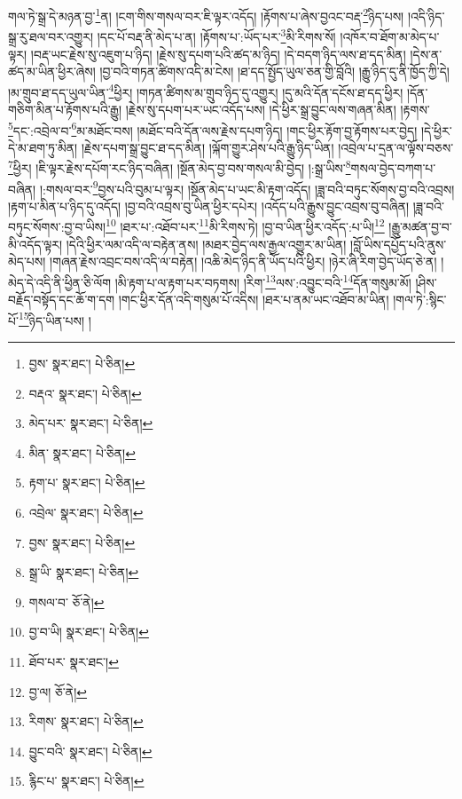གལ་ཏེ་སྒྲ་དེ་མཉན་བྱ་\footnote{བྱས་  སྣར་ཐང་།  པེ་ཅིན། }ན། །ངག་གིས་གསལ་བར་ཇི་ལྟར་འདོད། །རྟོགས་པ་ཞེས་བྱའང་བརྡ་\footnote{བརྡའ་  སྣར་ཐང་།  པེ་ཅིན། }ཉིད་པས། །འདི་ཉིད་སྒྲ་རུ་ཐལ་བར་འགྱུར། །དང་པོ་བརྡ་ནི་མེད་པ་ན། །རྟོགས་པ་:ཡོད་པར་\footnote{མེད་པར་  སྣར་ཐང་།  པེ་ཅིན། }མི་རིགས་སོ། །འཁོར་བ་ཐོག་མ་མེད་པ་ལྟར། །བརྡ་ཡང་རྗེས་སུ་འཇུག་པ་ཉིད། །རྗེས་སུ་དཔག་པའི་ཚད་མ་ཉིད། །དེ་བདག་ཉིད་ལས་ཐ་དད་མིན། །དེས་ན་ཚད་མ་ཡིན་ཕྱིར་ཞེས། །བྱ་བའི་གཏན་ཚིགས་འདི་མ་ངེས། །ཐ་དད་སྤྱོད་ཡུལ་ཅན་གྱི་བློའི། །རྒྱུ་ཉིད་དུ་ནི་ཁྱོད་ཀྱི་དེ། །མ་གྲུབ་ཐ་དད་ཡུལ་ཡིན་\footnote{མིན་  སྣར་ཐང་།  པེ་ཅིན། }ཕྱིར། །གཏན་ཚིགས་མ་གྲུབ་ཉིད་དུ་འགྱུར། །དུ་མའི་དོན་དངོས་ཐ་དད་ཕྱིར། །དོན་གཅིག་མིན་པ་རྟོགས་པའི་རྒྱུ། །རྗེས་སུ་དཔག་པར་ཡང་འདོད་པས། །དེ་ཕྱིར་སྒྲ་བྱུང་ལས་གཞན་མིན། །རྟགས་\footnote{རྟག་པ་  སྣར་ཐང་།  པེ་ཅིན། }དང་:འབྲེལ་བ་\footnote{འབྲེལ་  སྣར་ཐང་།  པེ་ཅིན། }མ་མཐོང་བས། །མཐོང་བའི་དོན་ལས་རྗེས་དཔག་ཉིད། །གང་ཕྱིར་རྟོག་བྱ་རྟོགས་པར་བྱེད། །དེ་ཕྱིར་དེ་མ་ཐག་ཏུ་མིན། །རྗེས་དཔག་སྒྲ་བྱུང་ཐ་དད་མིན། །ལྐོག་གྱུར་ཤེས་པའི་རྒྱུ་ཉིད་ཡིན། །འབྲེལ་པ་དྲན་ལ་ལྟོས་བཅས་\footnote{བྱས་  སྣར་ཐང་།  པེ་ཅིན། }ཕྱིར། །ཇི་ལྟར་རྗེས་དཔོག་རང་ཉིད་བཞིན། །སྔོན་མེད་བྱ་བས་གསལ་མི་བྱེད། །:སྒྲ་ཡིས་\footnote{སྒྲ་ཡི་  སྣར་ཐང་།  པེ་ཅིན། }གསལ་བྱེད་བཀག་པ་བཞིན། །:གསལ་བར་\footnote{གསལ་བ་  ཅོ་ནེ། }བྱས་པའི་བུམ་པ་ལྟར། །སྔོན་མེད་པ་ཡང་མི་རྟག་འདོད། །ཟླ་བའི་བཏུང་སོགས་བྱ་བའི་འབྲས། །རྟག་པ་མིན་པ་ཉིད་དུ་འདོད། །བྱ་བའི་འབྲས་བུ་ཡིན་ཕྱིར་དཔེར། །འདོད་པའི་རྒྱུས་བྱུང་འབྲས་བུ་བཞིན། །ཟླ་བའི་བཏུང་སོགས་:བྱ་བ་ཡིས།\footnote{བྱ་བ་ཡི།  སྣར་ཐང་།  པེ་ཅིན། } །ཐར་པ་:འཐོབ་པར་\footnote{ཐོབ་པར་  སྣར་ཐང་། }མི་རིགས་ཏེ། །བྱ་བ་ཡིན་ཕྱིར་འདོད་:པ་ཡི།\footnote{བྱ་ལ།  ཅོ་ནེ། } །རྒྱུ་མཚན་བྱ་བ་མི་འདོད་ལྟར། །དེའི་ཕྱིར་ལམ་འདི་ལ་བརྟེན་ནས། །མཐར་བྱེད་ལས་རྒྱལ་འགྱུར་མ་ཡིན། །བློ་ཡིས་དཔྱོད་པའི་ནུས་མེད་པས། །གཞན་རྗེས་འབྲང་བས་འདི་ལ་བརྟེན། །འཆི་མེད་ཉིད་ནི་ཡོད་པའི་ཕྱིར། །ཉེར་ཞི་རིག་བྱེད་ཡོད་ཅེ་ན། །མེད་དེ་འདི་ནི་ཕྱིན་ཅི་ལོག །མི་རྟག་པ་ལ་རྟག་པར་བཏགས། །རིག་\footnote{རིགས་  སྣར་ཐང་།  པེ་ཅིན། }ལས་:འབྱུང་བའི་\footnote{བྱུང་བའི་  སྣར་ཐང་།  པེ་ཅིན། }དོན་གསུམ་མོ། །ཤིས་བརྗོད་བསྟོད་དང་ཆོ་ག་དག །གང་ཕྱིར་དོན་འདི་གསུམ་པོ་འདིས། །ཐར་པ་ནམ་ཡང་འཐོབ་མ་ཡིན། །གལ་ཏེ་:སྙིང་པོ་\footnote{རྙིང་པ་  སྣར་ཐང་།  པེ་ཅིན། }ཉིད་ཡིན་པས། །
